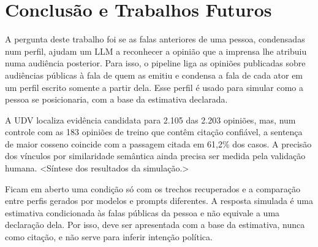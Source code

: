 \section{Conclus\~ao e Trabalhos Futuros}
\label{sec:conclusao}

A pergunta deste trabalho foi se as falas anteriores de uma pessoa, condensadas num perfil, ajudam
um LLM a reconhecer a opinião que a imprensa lhe atribuiu numa audiência posterior. Para isso, o
pipeline liga as opiniões publicadas sobre audiências públicas à fala de quem as emitiu e condensa a
fala de cada ator em um perfil escrito somente a partir dela. Esse perfil é usado para simular como a
pessoa se posicionaria, com a base da estimativa declarada.

A UDV localiza evidência candidata para 2.105 das 2.203 opiniões, mas, num controle com as 183
opiniões de treino que contêm citação confiável, a sentença de maior cosseno coincide com a passagem
citada em 61,2\% dos casos. A precisão dos vínculos por similaridade semântica ainda precisa ser
medida pela validação humana. <Síntese dos resultados da simulação.>

Ficam em aberto uma condição só com os trechos recuperados e a comparação entre perfis gerados por
modelos e prompts diferentes. A resposta simulada é uma estimativa condicionada às falas públicas da
pessoa e não equivale a uma declaração dela. Por isso, deve ser apresentada com a base da
estimativa, nunca como citação, e não serve para inferir intenção política.
